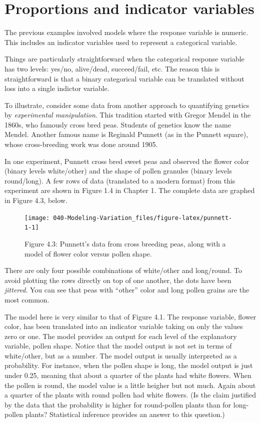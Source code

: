 \documentclass[]{tufte-book}
\begin{document}
\hypertarget{proportions-and-indicator-variables}{%
\section{Proportions and indicator variables}\label{proportions-and-indicator-variables}}

The previous examples involved models where the response variable is numeric. This includes an indicator variables used to represent a categorical variable.

Things are particularly straightforward when the categorical response variable has two levels: yes/no, alive/dead, succeed/fail, etc. The reason this is straightforward is that a binary categorical variable can be translated without loss into a single indictor variable.

To illustrate, consider some data from another approach to quantifying genetics by \emph{experimental manipulation}. This tradition started with Gregor Mendel in the 1860s, who famously cross bred peas. Students of genetics know the name Mendel. Another famous name is Reginald Punnett (as in the Punnett square), whose cross-breeding work was done around 1905.

In one experiment, Punnett cross bred sweet peas and observed the flower color (binary levels white/other) and the shape of pollen granules (binary levels round/long). A few rows of data (translated to a modern format) from this experiment are shown in Figure 1.4 in Chapter 1. The complete data are graphed in Figure 4.3, below.

\begin{figure}\texttt{[image: 040-Modeling-Variation\_files/figure-latex/punnett-1-1]} \caption[Figure 4.3]{Figure 4.3: Punnett's data from cross breeding peas, along with a model of flower color versus pollen shape.}\label{fig:punnett-1}
\end{figure}

There are only four possible combinations of white/other and long/round. To avoid plotting the rows directly on top of one another, the dots have been \emph{jittered}. You can see that peas with ``other'' color and long pollen grains are the most common.

The model here is very similar to that of Figure 4.1. The response variable, flower color, has been translated into an indicator variable taking on only the values zero or one. The model provides an output for each level of the explanatory variable, pollen shape. Notice that the model output is not set in terms of white/other, but as a number. The model output is usually interpreted as a probability. For instance, when the pollen shape is long, the model output is just under 0.25, meaning that about a quarter of the plants had white flowers. When the pollen is round, the model value is a little heigher but not much. Again about a quarter of the plants with round pollen had white flowers. (Is the claim justified by the data that the probability is higher for round-pollen plants than for long-pollen plants? Statistical inference provides an answer to this question.)
\end{document}
